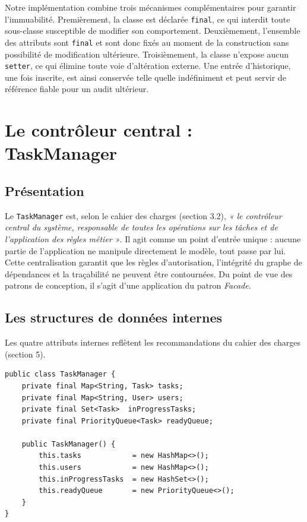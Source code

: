 \documentclass[11pt]{article}
\begin{document}
Notre implémentation combine trois mécanismes complémentaires pour
garantir l'immuabilité. Premièrement, la classe est déclarée
\texttt{final}, ce qui interdit toute sous-classe susceptible de
modifier son comportement. Deuxièmement, l'ensemble des attributs sont
\texttt{final} et sont donc fixés au moment de la construction sans
possibilité de modification ultérieure. Troisièmement, la classe
n'expose aucun \texttt{setter}, ce qui élimine toute voie d'altération
externe. Une entrée d'historique, une fois inscrite, est ainsi conservée
telle quelle indéfiniment et peut servir de référence fiable pour un
audit ultérieur.

\section{Le contrôleur central : TaskManager}

\subsection{Présentation}
Le \texttt{TaskManager} est, selon le cahier des charges (section 3.2),
\textit{« le contrôleur central du système, responsable de toutes les
opérations sur les tâches et de l'application des règles métier »}. Il
agit comme un point d'entrée unique : aucune partie de l'application ne
manipule directement le modèle, tout passe par lui. Cette centralisation
garantit que les règles d'autorisation, l'intégrité du graphe de
dépendances et la traçabilité ne peuvent être contournées. Du point de
vue des patrons de conception, il s'agit d'une application du patron
\textit{Facade}.

\subsection{Les structures de données internes}
Les quatre attributs internes reflètent les recommandations du cahier
des charges (section 5).

\begin{lstlisting}[caption={Attributs internes du TaskManager}]
public class TaskManager {
    private final Map<String, Task> tasks;
    private final Map<String, User> users;
    private final Set<Task>  inProgressTasks;
    private final PriorityQueue<Task> readyQueue;

    public TaskManager() {
        this.tasks            = new HashMap<>();
        this.users            = new HashMap<>();
        this.inProgressTasks  = new HashSet<>();
        this.readyQueue       = new PriorityQueue<>();
    }
}
\end{lstlisting}
\end{document}
